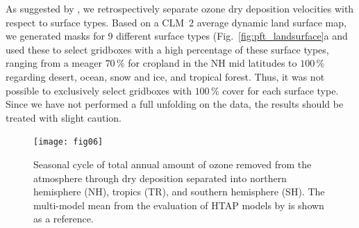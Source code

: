\documentclass[gmd, manuscript]{copernicus}
\begin{document}
As suggested by \citet{ACP:Hardacre2015}, we retrospectively separate ozone dry deposition velocities with respect to surface types. Based on a CLM~2 average dynamic land surface map, we generated masks for 9 different surface types (Fig.~\ref{fig:pft_landsurface}a and used these to select gridboxes with a high percentage of these surface types, ranging from a meager $70\,\unit{\%}$ for cropland in the NH mid latitudes to $100\,\unit{\%}$ regarding desert, ocean, snow and ice, and tropical forest. Thus, it was not possible to exclusively select gridboxes with $100\,\unit{\%}$ cover for each surface type. Since we have not performed a full unfolding on the data, the results should be treated with slight caution. 
%
\begin{figure}[t]
  \texttt{[image: fig06]}
  \caption{Seasonal cycle of total annual amount of ozone removed from the atmosphere through dry deposition separated into northern hemisphere (NH), tropics (TR), and southern hemisphere (SH). The multi-model mean from the evaluation of HTAP models by \citet{ACP:Hardacre2015} is shown as a reference.}
  \label{fig:mmm_drydep_hem}
\end{figure}
%
\end{document}
